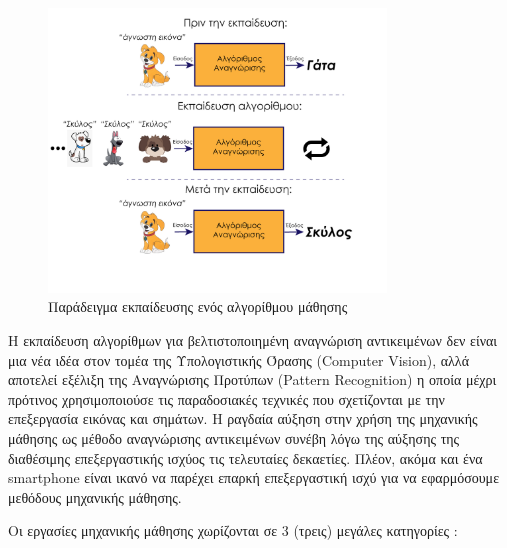 \begin{figure}[H]
    \centering
    \includegraphics[width=0.8\textwidth]{images/learning_explained.png}
    \caption{Παράδειγμα εκπαίδευσης ενός αλγορίθμου μάθησης}
    \label{fig:learning-explained}
\end{figure}
\hspace{1cm}

Η εκπαίδευση αλγορίθμων για βελτιστοποιημένη αναγνώριση αντικειμένων δεν είναι μια νέα ιδέα στον τομέα της Υπολογιστικής Όρασης (Computer Vision), αλλά αποτελεί εξέλιξη της Αναγνώρισης Προτύπων (Pattern Recognition) η οποία μέχρι πρότινος χρησιμοποιούσε τις παραδοσιακές τεχνικές που σχετίζονται με την επεξεργασία εικόνας και σημάτων. Η ραγδαία αύξηση στην χρήση της μηχανικής μάθησης ως μέθοδο αναγνώρισης αντικειμένων συνέβη λόγω της αύξησης της διαθέσιμης επεξεργαστικής ισχύος τις τελευταίες δεκαετίες. Πλέον, ακόμα και ένα smartphone είναι ικανό να παρέχει επαρκή επεξεργαστική ισχύ για να εφαρμόσουμε μεθόδους μηχανικής μάθησης.

Οι εργασίες μηχανικής μάθησης χωρίζονται σε 3 (τρεις) μεγάλες κατηγορίες \cite{russell2016artificial} :

